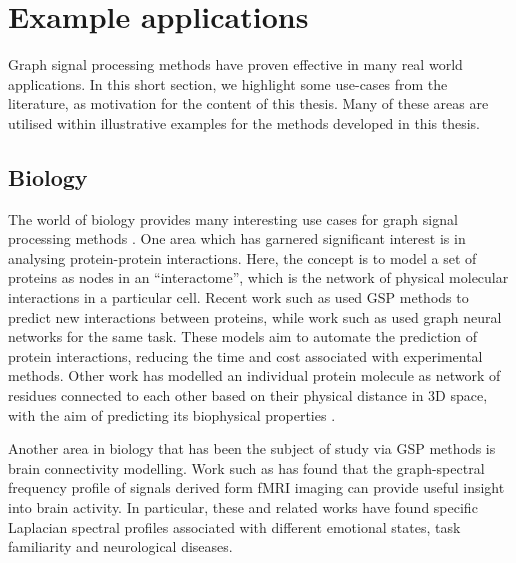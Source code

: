 

\newpage

\section{Example applications}

Graph signal processing methods have proven effective in many real world applications. In this short section, we highlight some use-cases from the literature, as motivation for the content of this thesis. Many of these areas are utilised within illustrative examples for the methods developed in this thesis. 

\subsection{Biology}

The world of biology provides many interesting use cases for graph signal processing methods \citep{Li2023}. One area which has garnered significant interest is in analysing protein-protein interactions. Here, the concept is to model a set of proteins as nodes in an ``interactome'', which is the network of physical molecular interactions in a particular cell. Recent work such as \cite{Colonnese2021} used GSP methods to predict new interactions between proteins, while work such as \cite{Jha2022} used graph neural networks for the same task. These models aim to automate the prediction of protein interactions, reducing the time and cost associated with experimental methods. Other work has modelled an individual protein molecule as network of residues connected to each other based on their physical distance in 3D space, with the aim of predicting its biophysical properties \citep{Srivastava2023}. 

Another area in biology that has been the subject of study via GSP methods is brain connectivity modelling. Work such as \cite{Goldsberry2017,Atasoy2016,Menoret2017,Itani2021} has found that the graph-spectral frequency profile of signals derived form fMRI imaging can provide useful insight into brain activity. In particular, these and related works have found specific Laplacian spectral profiles associated with different emotional states, task familiarity and neurological diseases. 

